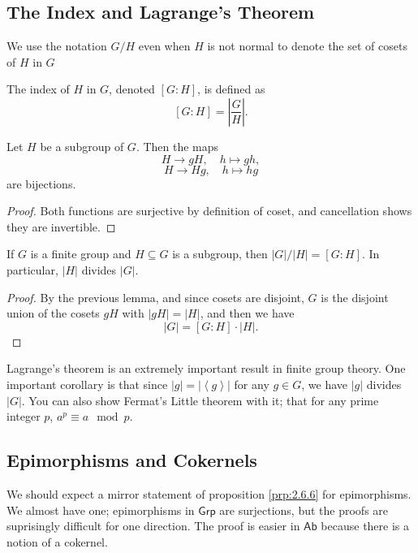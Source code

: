 \subsection{The Index and Lagrange's Theorem}
We use the notation  $G /H$ even when $H$ is not normal to denote the set of cosets of $H$ in $G$
\begin{definition}[Index]\label{dfn:2.8.1}
	The index of $H$ in  $G$, denoted $[G : H]$, is defined as
	\[
		[G:H] = \left| \frac{G}{H} \right| 
	.\]
\end{definition}
\begin{lemma}\label{lma:2.8.1}
	Let $H$ be a subgroup of $G$. Then the maps
	\[
		H\to gH,\quad h\mapsto gh,
	\]
	\[
		H\to Hg,\quad h\mapsto hg
	\]
	are bijections.
\end{lemma}
\begin{proof}
	Both functions are surjective by definition of coset, and cancellation shows they are invertible.
\end{proof}
\begin{corollary}\label{cor:2.8.2}
	If $G$ is a finite group and $H\subseteq G$ is a subgroup, then $\left| G \right| / \left| H \right| =[G:H]$. In particular, $\left| H \right| $ divides $\left| G \right| $.
\end{corollary}
\begin{proof}
	By the previous lemma, and since cosets are disjoint, $G$ is the disjoint union of the cosets $gH$ with $\left| gH \right| =\left| H \right| $, and then we have
	\[
		\left| G \right| =[G:H]\cdot \left| H \right| 
	.\]
\end{proof}

Lagrange's theorem is an extremely important result in finite group theory. One important corollary is that since $\left| g \right| = \left| \left\langle g \right\rangle  \right| $ for any $g\in G$, we have $\left| g \right| $ divides $\left| G \right| $. You can also show Fermat's Little theorem with it; that for any prime integer $p$, $a^p \equiv a\mod{p}$.

\subsection{Epimorphisms and Cokernels}
We should expect a mirror statement of proposition \ref{prp:2.6.6} for epimorphisms. We almost have one; epimorphisms in $\mathsf{Grp}$ are surjections, but the proofs are suprisingly difficult for one direction. The proof is easier in $\mathsf{Ab}$ because there is a notion of a cokernel.

